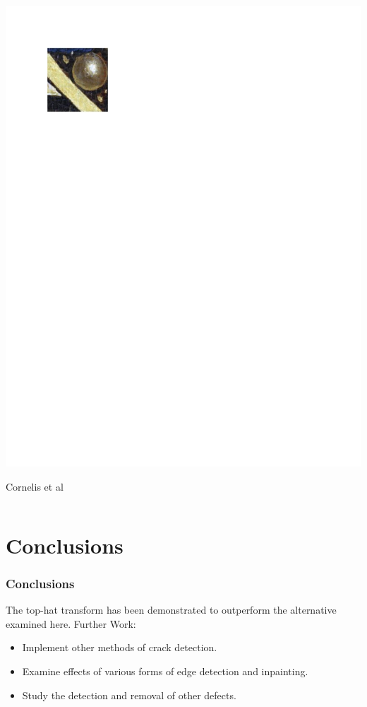 \documentclass{beamer}
\begin{document}
\begin{frame}
\begin{columns}
\begin{column}{0.5\textwidth}
\includegraphics[width=1\textwidth,trim={0.5in 8.4in 5.5in 0.75in},clip]{ghent_altarpiece_restored}
\begin{center}
\tiny Cornelis et al
\end{center}
\end{column}
\end{columns}
\end{frame}

\section[Conclusions]{Conclusions}

\begin{frame}
\frametitle[Conclusions]{Conclusions}
The top-hat transform has been demonstrated to outperform the alternative examined here.
\linebreak
\linebreak
\linebreak
Further Work:
\begin{itemize}
\item Implement other methods of crack detection.
\item Examine effects of various forms of edge detection and inpainting.
\item Study the detection and removal of other defects.
\end{itemize}
\end{frame}
\end{document}
